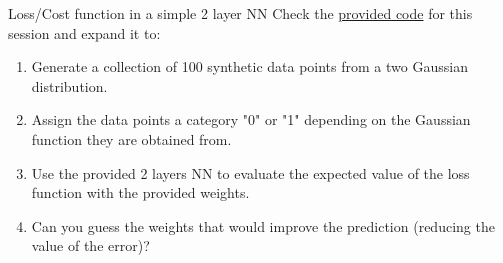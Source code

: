 \documentclass{beamer}
\begin{document}
\begin{frame}
    \begin{Exercise}{Loss/Cost function in a simple 2 layer NN}
        \label{Ex:2layer}
        Check the \href{https://github.com/Biocomputing-Teaching/Data-Science-with-Python/blob/main/code/UNIT9-Neural-Networks.ipynb}{provided code} for this session and expand it to:
        \begin{enumerate}
            \item Generate a collection of 100 synthetic data points from a two Gaussian distribution.
            \item Assign the data points a category "0" or "1" depending on the Gaussian function they are obtained from.
            \item Use the provided 2 layers NN to evaluate the expected value of the loss function with the provided weights.
            \item Can you guess the weights that would improve the prediction (reducing the value of the error)?
        \end{enumerate}
    \end{Exercise}
\end{frame}
\end{document}
